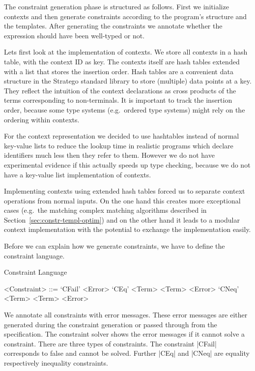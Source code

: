 The constraint generation phase is structured as follows. First we
initialize contexts and then generate constraints according to the
program's structure and the templates. After generating the constraints
we annotate whether the expression should have been well-typed or not.

Lets first look at the implementation of contexts. We store all
contexts in a hash table, with the context ID as key. The contexts
itself are hash tables extended with a list that stores the insertion
order. Hash tables are a convenient data structure in the Stratego
standard library to store (multiple) data points at a key. They
reflect the intuition of the context declarations as cross products of
the terms corresponding to non-terminals. It is important to track the
insertion order, because some type systems (e.g.\ ordered type
systems) might rely on the ordering within contexts.

For the context representation we decided to use hashtables instead of
normal key-value lists to reduce the lookup time in realistic programs
which declare identifiers much less then they refer to them. However
we do not have experimental evidence if this actually speeds up type
checking, because we do not have a key-value list implementation of
contexts.

Implementing contexts using extended hash tables forced us to separate
context operations from normal inputs. On the one hand this creates
more exceptional cases (e.g.\ the matching complex matching algorithms
described in Section~\ref{sec:constr-templ-optim}) and on the other
hand it leads to a modular context implementation with the potential
to exchange the implementation easily.

Before we can explain how we generate constraints, we have to define
the constraint language.

\begin{definition}{Constraint Language}
  \begin{grammar}
    <Constraint> ::= `CFail' <Error>
    \alt `CEq' <Term> <Term> <Error>
    \alt `CNeq' <Term> <Term> <Error>
  \end{grammar}
\end{definition}

We annotate all constraints with error messages. These error messages
are either generated during the constraint generation or passed
through from the specification. The constraint solver shows the error
messages if it cannot solve a constraint. There are three types of
constraints. The constraint \code|CFail| corresponds to false and
cannot be solved. Further \code|CEq| and \code|CNeq| are equality
respectively inequality constraints.

